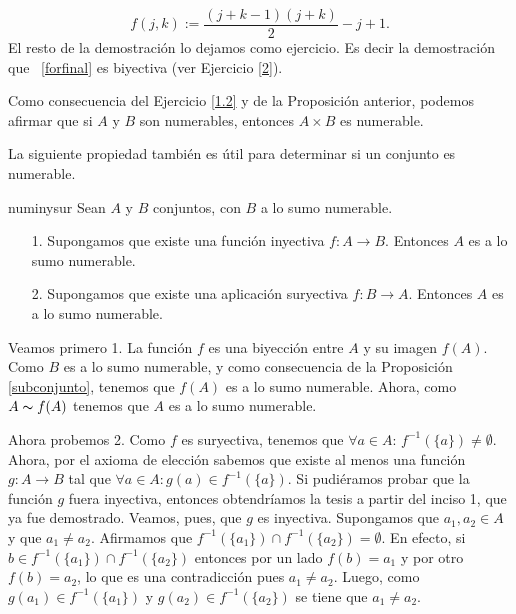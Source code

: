 \begin{demo}
\begin{equation}\label{forfinal}
f(j,k):=\frac{(j+k-1)(j+k)}{2}-j+1.
\end{equation}
El resto de la demostración lo dejamos como ejercicio. Es decir la   demostración que ~\eqref{forfinal} es
biyectiva (ver Ejercicio \vref{2}).
\end{demo}

Como consecuencia del Ejercicio \vref{1.2} y de la Proposición
anterior, podemos afirmar que si $A$ y $B$ son numerables,
entonces $A\times B$ es numerable.



La siguiente propiedad también es útil para determinar si un
conjunto es numerable.

\begin{proposicion}{numinysur} Sean $A$ y $B$ conjuntos, con $B$ a lo sumo
numerable.
\begin{itemize}
\item[1.] Supongamos que existe una función inyectiva 
$f:A \longrightarrow B$. Entonces $A$ es a lo sumo numerable.
\item[2.] Supongamos que existe una aplicación suryectiva
$f:B\longrightarrow A$. Entonces $A$ es a lo sumo numerable.
\end{itemize}
\end{proposicion}
\begin{demo} Veamos primero 1. La función $f$ es  una biyección entre $A$ y su
imagen $f(A)$. Como $B$ es a lo sumo numerable,  y como
consecuencia de la Proposición \vref{subconjunto}, tenemos que
$f(A)$ es a lo sumo numerable. Ahora, como $A\thicksim f(A)$
tenemos que $A$ es a lo sumo numerable.

Ahora probemos 2. Como $f$ es suryectiva, tenemos que $\forall
a\in A$: $f^{-1}(\{a\})\neq\emptyset$. Ahora, por el axioma de
elección sabemos que existe al menos una función
$g:A\longrightarrow B$ tal que $\forall a\in A:g(a)\in
f^{-1}(\{a\})$. Si pudiéramos probar que la función $g$ fuera
inyectiva, entonces obtendríamos la tesis a partir del inciso
1, que ya fue demostrado. Veamos, pues, que $g$ es inyectiva.
Supongamos que $a_1,a_2\in A$ y que $a_1\neq a_2$. Afirmamos que
$f^{-1}(\{a_1\})\cap f^{-1}(\{a_2\})=\emptyset$. En efecto, si
$b\in f^{-1}(\{a_1\})\cap f^{-1}(\{a_2\})$ entonces por un lado
 $f(b)=a_1$ y por otro $f(b)=a_2$, lo que es una contradicción pues $a_1\neq a_2$. Luego, como $g(a_1)\in f^{-1}(\{a_1\})$ y 
$g(a_2)\in f^{-1}(\{a_2\})$ se tiene que $a_1\neq a_2$.
 \end{demo}

